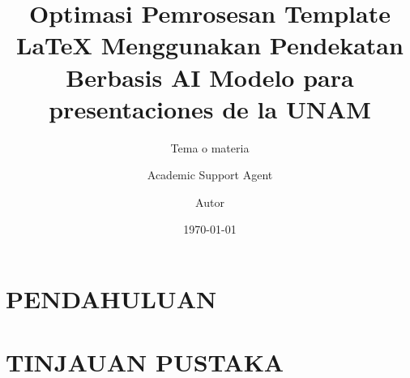 \documentclass{beamer}
\title{Optimasi Pemrosesan Template LaTeX Menggunakan Pendekatan Berbasis AI}
\author{Academic Support Agent}
\date{\today}
\begin{document}
\maketitle

\begin{abstract}

\end{abstract}

\chapter{PENDAHULUAN}


\chapter{TINJAUAN PUSTAKA}


\usepackage[utf8]{inputenc}
\usepackage[spanish]{babel}
\usepackage[T1]{fontenc}
\usepackage{helvet}
\usepackage{lipsum}
\usepackage{amsmath,amssymb,amsfonts}
\usepackage{amsthm}
\usepackage{physics}
\usepackage{framed, color}
\usepackage{epsfig}
\usepackage{acronym}
\usepackage{multirow, array} 
\usepackage{float}
\usepackage[T1]{fontenc}
\usepackage{natbib}
\usepackage{fancyhdr}
\usepackage{xcolor}
\usepackage{multicol}
\usepackage{mdframed}
\usepackage{endnotes}
\usepackage{listings}
\usepackage{tensor}
\usepackage{csquotes}
\renewcommand{\thefootnote}{\arabic{footnote}}
\newcommand{\chref}[2]{
  \href{#1}{{\usebeamercolor[bg]{Feather}#2}}
}
\title[]
{
      \textbf{Modelo para presentaciones de la UNAM}
}

\subtitle[Tema o materia]
{Tema o materia}

\author[Autor]
{      Autor
}
\end{document}
